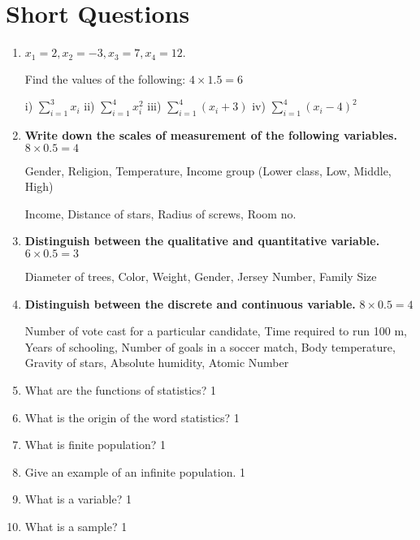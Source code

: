 \documentclass[a4paper,oneside]{book}
\begin{document}
\begin{enumerate}
  
  \end{enumerate}

\section{Short Questions}
\begin{enumerate}
    \item
	$x_1=2, x_2=-3, x_3=7, x_4=12.$ 
	
	Find the values of the following: \hfill $4 \times 1.5 = 6$
	
	i) $\displaystyle \sum_{i=1}^3 x_i$ 
	ii) $\displaystyle \sum_{i=1}^4 x_i^2$
	iii) $\displaystyle \sum_{i=1}^4 (x_i+3)$
	iv) $\displaystyle \sum_{i=1}^4 (x_i-4)^2$
	
	
	\item \textbf{Write down the scales of measurement of the following variables.} \hfill $8 \times 0.5 = 4$

	Gender, Religion, Temperature, Income group (Lower class, Low, Middle, High)
	
Income, Distance of stars, Radius of screws, Room no.

\item \textbf{Distinguish between the qualitative and quantitative variable.} \hfill $6 \times 0.5 = 3$

Diameter of trees, Color, Weight, Gender, Jersey Number, Family Size

\item \textbf{Distinguish between the discrete and continuous variable.} \hfill $8 \times 0.5 = 4$

Number of vote cast for a particular candidate, Time required to run 100 m, Years of schooling, Number of goals in a soccer match, Body temperature, Gravity of stars, Absolute humidity, Atomic Number

\item What are the functions of statistics? \hfill 1

\item What is the origin of the word statistics? \hfill 1

\item What is finite population? \hfill 1

\item Give an example of an infinite population. \hfill 1

\item What is a variable? \hfill 1

\item What is a sample? \hfill 1


\end{enumerate}
\end{document}
